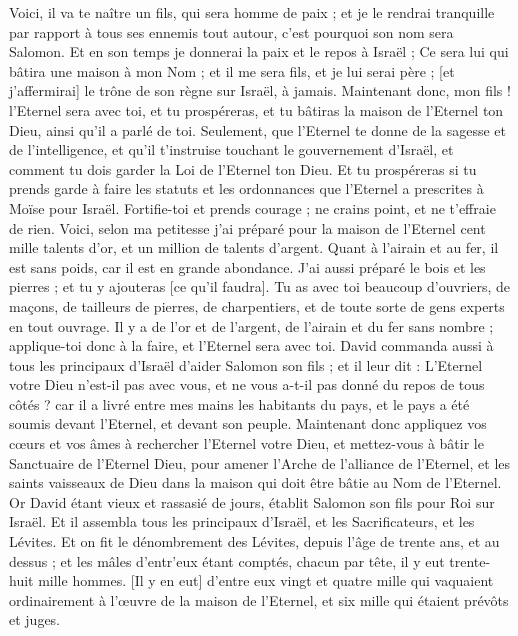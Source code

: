\begin{multicols}{2}
Voici, il va te naître un fils, qui sera homme de paix ; et je le rendrai tranquille par rapport à tous ses ennemis tout autour, c'est pourquoi son nom sera Salomon. Et en son temps je donnerai la paix et le repos à Israël ;
Ce sera lui qui bâtira une maison à mon Nom ; et il me sera fils, et je lui serai père ; [et j'affermirai] le trône de son règne sur Israël, à jamais.
Maintenant donc, mon fils ! l'Eternel sera avec toi, et tu prospéreras, et tu bâtiras la maison de l'Eternel ton Dieu, ainsi qu'il a parlé de toi.
Seulement, que l'Eternel te donne de la sagesse et de l'intelligence, et qu'il t'instruise touchant le gouvernement d'Israël, et comment tu dois garder la Loi de l'Eternel ton Dieu.
Et tu prospéreras si tu prends garde à faire les statuts et les ordonnances que l'Eternel a prescrites à Moïse pour Israël. Fortifie-toi et prends courage ; ne crains point, et ne t'effraie de rien.
Voici, selon ma petitesse j'ai préparé pour la maison de l'Eternel cent mille talents d'or, et un million de talents d'argent. Quant à l'airain et au fer, il est sans poids, car il est en grande abondance. J'ai aussi préparé le bois et les pierres ; et tu y ajouteras [ce qu'il faudra].
Tu as avec toi beaucoup d'ouvriers, de maçons, de tailleurs de pierres, de charpentiers, et de toute sorte de gens experts en tout ouvrage.
Il y a de l'or et de l'argent, de l'airain et du fer sans nombre ; applique-toi donc à la faire, et l'Eternel sera avec toi.
David commanda aussi à tous les principaux d'Israël d'aider Salomon son fils ; et il leur dit :
L'Eternel votre Dieu n'est-il pas avec vous, et ne vous a-t-il pas donné du repos de tous côtés ? car il a livré entre mes mains les habitants du pays, et le pays a été soumis devant l'Eternel, et devant son peuple.
Maintenant donc appliquez vos cœurs et vos âmes à rechercher l'Eternel votre Dieu, et mettez-vous à bâtir le Sanctuaire de l'Eternel Dieu, pour amener l'Arche de l'alliance de l'Eternel, et les saints vaisseaux de Dieu dans la maison qui doit être bâtie au Nom de l'Eternel.
\VerseOne{}Or David étant vieux et rassasié de jours, établit Salomon son fils pour Roi sur Israël.
Et il assembla tous les principaux d'Israël, et les Sacrificateurs, et les Lévites.
Et on fit le dénombrement des Lévites, depuis l'âge de trente ans, et au dessus ; et les mâles d'entr'eux étant comptés, chacun par tête, il y eut trente-huit mille hommes.
[Il y en eut] d'entre eux vingt et quatre mille qui vaquaient ordinairement à l'œuvre de la maison de l'Eternel, et six mille qui étaient prévôts et juges.

\end{multicols}
